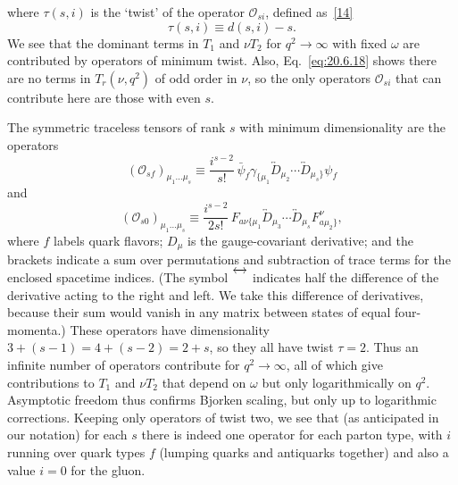 where $\tau(s,i)$ is the `twist' of the operator $\mathcal O_{si}$, defined as~\hyperref[ch20-ref-14]{[14]}
\begin{equation}
\tau(s,i)\equiv d(s,i)-s.
\tag{20.6.22}\label{eq:20.6.22}
\end{equation}
We see that the dominant terms in $T_1$ and $\nu T_2$ for $q^2\to\infty$ with fixed $\omega$ are contributed by operators of minimum twist. Also, Eq.~\eqref{eq:20.6.18} shows there are no terms in $T_r(\nu,q^2)$ of odd order in $\nu$, so the only operators $\mathcal O_{si}$ that can contribute here are those with even $s$.

The symmetric traceless tensors of rank $s$ with minimum dimensionality are the operators
\begin{equation}
(\mathcal O_{sf})_{\mu_1\ldots\mu_s}
\equiv
\frac{i^{s-2}}{s!}\,
\bar\psi_f\gamma_{\{\mu_1}
\overleftrightarrow D_{\mu_2}\cdots
\overleftrightarrow D_{\mu_s\}}\psi_f
\tag{20.6.23}\label{eq:20.6.23}
\end{equation}
and
\begin{equation}
(\mathcal O_{s0})_{\mu_1\ldots\mu_s}
\equiv
\frac{i^{s-2}}{2s!}\,
F_{a\nu\{\mu_1}
\overleftrightarrow D_{\mu_3}\cdots
\overleftrightarrow D_{\mu_s}
F^\nu_{a\mu_2\}},
\tag{20.6.24}\label{eq:20.6.24}
\end{equation}
where $f$ labels quark flavors; $D_\mu$ is the gauge-covariant derivative; and the brackets indicate a sum over permutations and subtraction of trace terms for the enclosed spacetime indices. (The symbol $\overleftrightarrow{\vphantom D}$ indicates half the difference of the derivative acting to the right and left. We take this difference of derivatives, because their sum would vanish in any matrix between states of equal four-momenta.) These operators have dimensionality $3+(s-1)=4+(s-2)=2+s$, so they all have twist $\tau=2$. Thus an infinite number of operators contribute for $q^2\to\infty$, all of which give contributions to $T_1$ and $\nu T_2$ that depend on $\omega$ but only logarithmically on $q^2$. Asymptotic freedom thus confirms Bjorken scaling, but only up to logarithmic corrections. Keeping only operators of twist two, we see that (as anticipated in our notation) for each $s$ there is indeed one operator for each parton type, with $i$ running over quark types $f$ (lumping quarks and antiquarks together) and also a value $i=0$ for the gluon.

